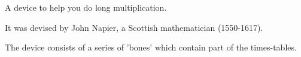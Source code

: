 A device to help you do long multiplication.  
\par
It was devised by John Napier, a Scottish mathematician (1550-1617).  
\par
The device consists of a series of 'bones' which contain part of the times-tables.